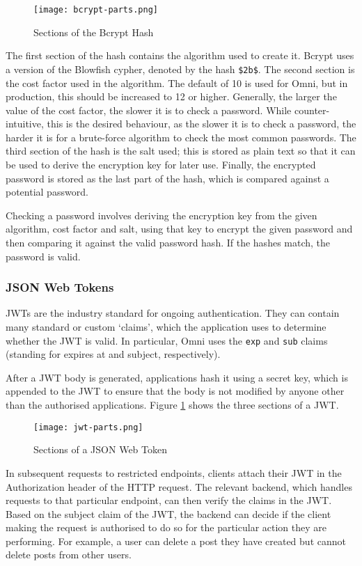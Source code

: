 \begin{figure}[htbp]
\texttt{[image: bcrypt-parts.png]}
\centering
\caption{Sections of the Bcrypt Hash}
\end{figure}

The first section of the hash contains the algorithm used to create it. Bcrypt uses a version of the Blowfish cypher, denoted by the hash \verb|$2b$|.
The second section is the cost factor used in the algorithm. The default of 10 is used for Omni, but in production, this should be increased to 12 or higher.
Generally, the larger the value of the cost factor, the slower it is to check a password.
While counter-intuitive, this is the desired behaviour, as the slower it is to check a password, the harder it is for a brute-force algorithm to check the most common passwords.
The third section of the hash is the salt used; this is stored as plain text so that it can be used to derive the encryption key for later use.
Finally, the encrypted password is stored as the last part of the hash, which is compared against a potential password.

Checking a password involves deriving the encryption key from the given algorithm, cost factor and salt, using that key to encrypt the given password and then comparing it against the valid password hash. If the hashes match, the password is valid.

\subsubsection{JSON Web Tokens}
JWTs are the industry standard for ongoing authentication. They can contain many standard or custom `claims', which the application uses to determine whether the JWT is valid.
In particular, Omni uses the \verb|exp| and \verb|sub| claims (standing for expires at and subject, respectively). 

After a JWT body is generated, applications hash it using a secret key, which is appended to the JWT to ensure that the body is not modified by anyone other than the authorised applications. 
Figure \ref{fig:jwt-parts} shows the three sections of a JWT.

\begin{figure}[htbp]
\texttt{[image: jwt-parts.png]}
\centering
\caption{Sections of a JSON Web Token}
\label{fig:jwt-parts}
\end{figure}

In subsequent requests to restricted endpoints, clients attach their JWT in the Authorization header of the HTTP request.
The relevant backend, which handles requests to that particular endpoint, can then verify the claims in the JWT.
Based on the subject claim of the JWT, the backend can decide if the client making the request is authorised to do so for the particular action they are performing.
For example, a user can delete a post they have created but cannot delete posts from other users.

